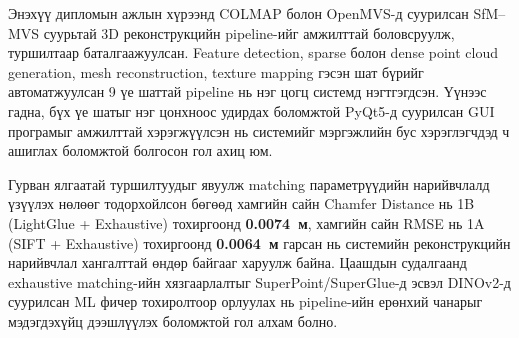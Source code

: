 Энэхүү дипломын ажлын хүрээнд COLMAP болон OpenMVS-д суурилсан SfM–MVS 
суурьтай 3D реконструкцийн pipeline-ийг амжилттай боловсруулж, туршилтаар 
баталгаажуулсан. Feature detection, sparse болон dense point cloud generation, 
mesh reconstruction, texture mapping гэсэн шат бүрийг автоматжуулсан 9 үе шаттай 
pipeline нь нэг цогц системд нэгтгэгдсэн. Үүнээс гадна, бүх үе шатыг нэг
цонхноос удирдах боломжтой PyQt5-д суурилсан GUI програмыг амжилттай
хэрэгжүүлсэн нь системийг мэргэжлийн бус хэрэглэгчдэд ч ашиглах боломжтой
болгосон гол ахиц юм.

Гурван ялгаатай туршилтуудыг явуулж matching параметрүүдийн нарийвчлалд үзүүлэх нөлөөг тодорхойлсон бөгөөд хамгийн сайн Chamfer Distance нь 1B (LightGlue + Exhaustive) тохиргоонд \textbf{0.0074~м}, хамгийн сайн RMSE нь 1A (SIFT + Exhaustive) тохиргоонд \textbf{0.0064~м} гарсан нь системийн реконструкцийн нарийвчлал хангалттай өндөр байгааг харуулж байна. Цаашдын 
судалгаанд exhaustive matching-ийн хязгаарлалтыг SuperPoint/SuperGlue-д эсвэл DINOv2-д суурилсан 
ML фичер тохиролтоор орлуулах нь pipeline-ийн ерөнхий чанарыг мэдэгдэхүйц 
дээшлүүлэх боломжтой гол алхам болно.


